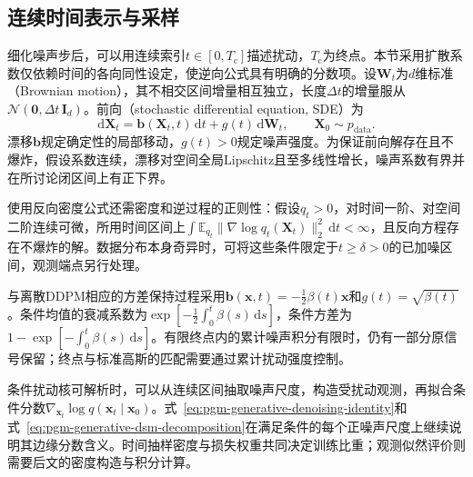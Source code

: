 \subsection{连续时间表示与采样}
\label{sec:pgm-generative-continuous-diffusion}

细化噪声步后，可以用连续索引$t\in[0,T_{\mathrm{c}}]$描述扰动，$T_{\mathrm{c}}$为终点。本节采用扩散系数仅依赖时间的各向同性设定，使逆向公式具有明确的分数项。设$\bm{W}_t$为$d$维标准（Brownian motion），其不相交区间增量相互独立，长度$\Delta t$的增量服从$\mathcal{N}(\bm{0},\Delta t\,\bm{I}_d)$。前向（stochastic differential equation, SDE）为
\begin{equation}
  \label{eq:pgm-generative-forward-sde}
  \mathrm{d}\bm{X}_t
  =\bm{b}(\bm{X}_t,t)\,\mathrm{d}t
    +g(t)\,\mathrm{d}\bm{W}_t,
  \qquad \bm{X}_0\sim p_{\mathrm{data}}.
\end{equation}
漂移$\bm{b}$规定确定性的局部移动，$g(t)>0$规定噪声强度。为保证前向解存在且不爆炸，假设系数连续，漂移对空间全局Lipschitz且至多线性增长，噪声系数有界并在所讨论闭区间上有正下界。

使用反向密度公式还需密度和逆过程的正则性：假设$q_t>0$，对时间一阶、对空间二阶连续可微，所用时间区间上$\int\mathbb{E}_{q_t}\lVert\nabla\log q_t(\bm{X}_t)\rVert_2^2\,\mathrm{d}t<\infty$，且反向方程存在不爆炸的解。数据分布本身奇异时，可将这些条件限定于$t\geq\delta>0$的已加噪区间，观测端点另行处理。

与离散DDPM相应的方差保持过程采用$\bm{b}(\bm{x},t)=-\tfrac12\beta(t)\bm{x}$和$g(t)=\sqrt{\beta(t)}$。条件均值的衰减系数为$\exp[-\tfrac12\int_0^t\beta(s)\,\mathrm{d}s]$，条件方差为$1-\exp[-\int_0^t\beta(s)\,\mathrm{d}s]$。有限终点内的累计噪声积分有限时，仍有一部分原信号保留；终点与标准高斯的匹配需要通过累计扰动强度控制。

条件扰动核可解析时，可以从连续区间抽取噪声尺度，构造受扰动观测，再拟合条件分数$\nabla_{\bm{x}_t}\log q(\bm{x}_t\mid\bm{x}_0)$。式~\eqref{eq:pgm-generative-denoising-identity}和式~\eqref{eq:pgm-generative-dsm-decomposition}在满足条件的每个正噪声尺度上继续说明其边缘分数含义。时间抽样密度与损失权重共同决定训练比重；观测似然评价则需要后文的密度构造与积分计算。

